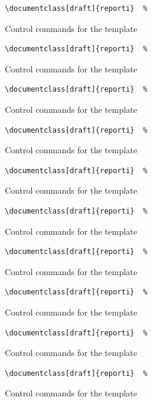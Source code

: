 \documentclass[english]{reporti}
\begin{document}
\begin{listing}[H]
\begin{verbatim}
\documentclass[draft]{reporti}  %
\end{verbatim}
\caption{Control commands for the template}
\end{listing}

\begin{listing}[H]
\begin{verbatim}
\documentclass[draft]{reporti}  %
\end{verbatim}
\caption{Control commands for the template}
\end{listing}
\begin{listing}[H]
\begin{verbatim}
\documentclass[draft]{reporti}  %
\end{verbatim}
\caption{Control commands for the template}
\end{listing}

\begin{listing}[H]
\begin{verbatim}
\documentclass[draft]{reporti}  %
\end{verbatim}
\caption{Control commands for the template}
\end{listing}

\begin{listing}[H]
\begin{verbatim}
\documentclass[draft]{reporti}  %
\end{verbatim}
\caption{Control commands for the template}
\end{listing}
\begin{listing}[H]
\begin{verbatim}
\documentclass[draft]{reporti}  %
\end{verbatim}
\caption{Control commands for the template}
\end{listing}

\begin{listing}[H]
\begin{verbatim}
\documentclass[draft]{reporti}  %
\end{verbatim}
\caption{Control commands for the template}
\end{listing}

\begin{listing}[H]
\begin{verbatim}
\documentclass[draft]{reporti}  %
\end{verbatim}
\caption{Control commands for the template}
\end{listing}
\begin{listing}[H]
\begin{verbatim}
\documentclass[draft]{reporti}  %
\end{verbatim}
\caption{Control commands for the template}
\end{listing}
\begin{listing}[H]
\begin{verbatim}
\documentclass[draft]{reporti}  %
\end{verbatim}
\caption{Control commands for the template}
\end{listing}
\end{document}
